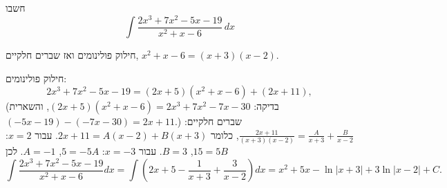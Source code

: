 
\begin{question}
חשבו
\[ \int\frac{2x^3+7x^2-5x-19}{x^2+x-6}\,dx \]
\end{question}

\begin{hint}
חילוק פולינומים ואז שברים חלקיים, $x^2+x-6=(x+3)(x-2)$.
\end{hint}

\begin{solution}
חילוק פולינומים:
\[ 2x^3+7x^2-5x-19=(2x+5)(x^2+x-6)+(2x+11), \]
(בדיקה: $(2x+5)(x^2+x-6)=2x^3+7x^2-7x-30$, והשארית $(-5x-19)-(-7x-30)=2x+11$.) שברים חלקיים: $\frac{2x+11}{(x+3)(x-2)}=\frac{A}{x+3}+\frac{B}{x-2}$, כלומר $2x+11=A(x-2)+B(x+3)$. עבור $x=2$: $15=5B$, $B=3$. עבור $x=-3$: $5=-5A$, $A=-1$. לכן
\[ \int\frac{2x^3+7x^2-5x-19}{x^2+x-6}dx=\int\left(2x+5-\frac1{x+3}+\frac3{x-2}\right)dx=\boxed{x^2+5x-\ln|x+3|+3\ln|x-2|+C}. \]
\end{solution}
